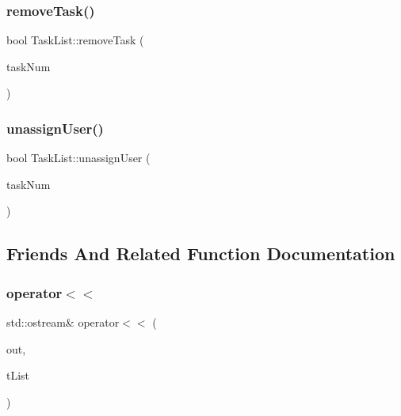 \mbox{\label{class_task_list_a9d698ff0a0059aac3c77522029662239}} 
\subsubsection{\texorpdfstring{remove\+Task()}{removeTask()}}
{\footnotesize\ttfamily bool Task\+List\+::remove\+Task (\begin{DoxyParamCaption}\item[{int}]{task\+Num }\end{DoxyParamCaption})}

\mbox{\label{class_task_list_aa67dfe4d6cdc1701c995e44bb0e59d56}} 
\subsubsection{\texorpdfstring{unassign\+User()}{unassignUser()}}
{\footnotesize\ttfamily bool Task\+List\+::unassign\+User (\begin{DoxyParamCaption}\item[{int}]{task\+Num }\end{DoxyParamCaption})}



\subsection{Friends And Related Function Documentation}
\mbox{\label{class_task_list_ac872aa1fde53a5f9336c1cc4d96bc733}} 
\subsubsection{\texorpdfstring{operator$<$$<$}{operator<<}}
{\footnotesize\ttfamily std\+::ostream\& operator$<$$<$ (\begin{DoxyParamCaption}\item[{std\+::ostream \&}]{out,  }\item[{\mbox{\hyperlink{class_task_list}{Task\+List}} \&}]{t\+List }\end{DoxyParamCaption})\hspace{0.3cm}{\ttfamily [friend]}}

